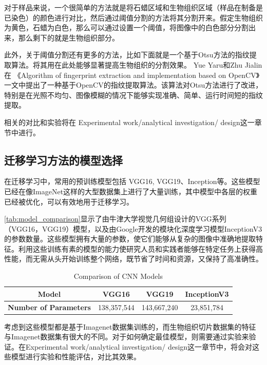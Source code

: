 对于样品来说，一个很简单的方法就是将石蜡区域和生物组织区域（样品在制备是已染色）的颜色进行对比，然后通过阈值分割的方法将其分割开来。假定生物组织为黄色，石蜡为白色，那么可以通过设置一个阈值，将图像中的白色部分分割出来，那么剩下的就是生物组织部分。

此外，关于阈值分割还有更多的方法，比如下面就是一个基于Otsu方法的指纹提取算法。将其用在此处能够显著提高生物组织的分割效果。
Yue Yaru和Zhu Jialin 在 《Algorithm of fingerprint extraction and implementation based on OpenCV》一文中提出了一种基于OpenCV的指纹提取算法。该算法对Otsu方法进行了改进，特别是在光照不均匀、图像模糊的情况下能够实现准确、简单、运行时间短的指纹提取。\cite{3.3}

相关的对比和实验将在 Experimental work/analytical investigation/ design这一章节中进行。


\subsection{迁移学习方法的模型选择}

在迁移学习中，常用的预训练模型包括 VGG16, VGG19、Inception等。这些模型已经在像ImageNet这样的大型数据集上进行了大量训练，其中模型中各层的权重已经被优化，可以有效地用于迁移学习。\cite{4.30 7}

\autoref{tab:model_comparison}显示了由牛津大学视觉几何组设计的VGG系列（VGG16，VGG19）模型\cite{DL.5}，以及由Google开发的模块化深度学习模型InceptionV3 \cite{DL.6}\cite{DL.7}的参数数量。这些模型拥有大量的参数，使它们能够从复杂的图像中准确地提取特征。利用这些训练有素的模型的能力使研究人员和实践者能够在特定任务上获得高性能，而无需从头开始训练整个网络，既节省了时间和资源，又保持了高准确性。\cite{4.30 8}

\begin{table}[H]
    \centering
    \caption{Comparison of CNN Models}
    \label{tab:model_comparison}
    \begin{tabular}{cccc}
        \toprule
        \textbf{Model} & \textbf{VGG16} & \textbf{VGG19} & \textbf{InceptionV3}\\
        \midrule
        \textbf{Number of Parameters} & 138,357,544 & 143,667,240 & 23,851,784 \\
        \bottomrule
    \end{tabular}
\end{table}

考虑到这些模型都是基于Imagenet数据集训练的，而生物组织切片数据集的特征与Imagenet数据集有很大的不同。对于如何确定最佳模型，则需要通过实验来验证。在Experimental work/analytical investigation/ design这一章节中，将会对这些模型进行实验和性能评估，对比其效果。






